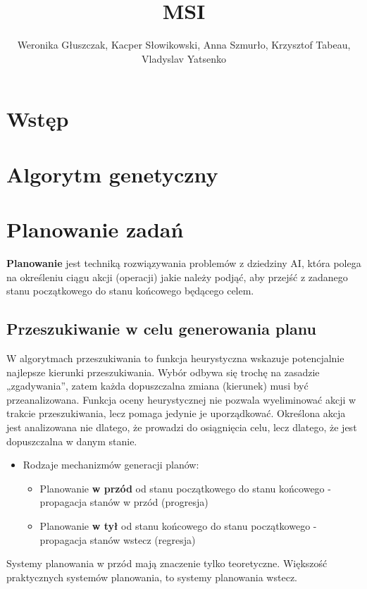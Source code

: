\documentclass{article}
\title{MSI}
\author{Weronika Głuszczak, Kacper Słowikowski, Anna Szmurło, Krzysztof Tabeau, Vladyslav Yatsenko}
\begin{document}
\maketitle
\cleardoublepage
\tableofcontents

\cleardoublepage
\section{Wstęp}

\section{Algorytm genetyczny}


\section{Planowanie zadań}
\textbf{Planowanie}  jest techniką rozwiązywania problemów z dziedziny
AI, która polega na określeniu ciągu akcji (operacji) jakie należy
podjąć, aby przejść z zadanego stanu początkowego do stanu
końcowego będącego celem.
\subsection{Przeszukiwanie w celu generowania planu}
W algorytmach przeszukiwania to funkcja heurystyczna wskazuje
potencjalnie najlepsze kierunki przeszukiwania. Wybór odbywa się trochę na zasadzie „zgadywania”, zatem każda dopuszczalna zmiana (kierunek) musi być przeanalizowana. Funkcja oceny heurystycznej nie pozwala wyeliminować akcji w
trakcie przeszukiwania, lecz pomaga jedynie je uporządkować. Określona akcja jest analizowana nie dlatego, że prowadzi do osiągnięcia celu, lecz dlatego, że jest dopuszczalna w danym stanie. \\
\begin{itemize}
\item Rodzaje mechanizmów generacji planów:
    \begin{itemize}
      \item Planowanie \textbf{w przód} od stanu początkowego do stanu końcowego - propagacja stanów w przód (progresja)
      \item Planowanie \textbf{w tył} od stanu końcowego do stanu początkowego - propagacja stanów wstecz (regresja)
    \end{itemize}
\end{itemize}
Systemy planowania w przód mają znaczenie tylko teoretyczne. Większość praktycznych systemów planowania, to systemy planowania wstecz.
\end{document}

